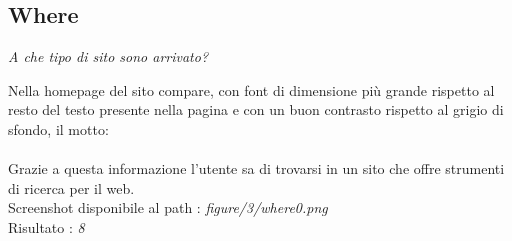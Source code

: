 \subsection{Where}\label{where}
\begin{center}

\textit{A che tipo di sito sono arrivato?}

\end{center}
\begin{flushleft}
Nella homepage del sito compare, con font  di dimensione
più grande rispetto al resto del testo presente nella pagina e con un buon
contrasto rispetto al grigio di sfondo, il motto: \\
 \\
Grazie a questa informazione l'utente sa di trovarsi in un sito che offre
strumenti di ricerca per il web. \\
Screenshot disponibile al path : \textit{figure/3/where0.png} \\
Risultato : \textit{8}
\end{flushleft}